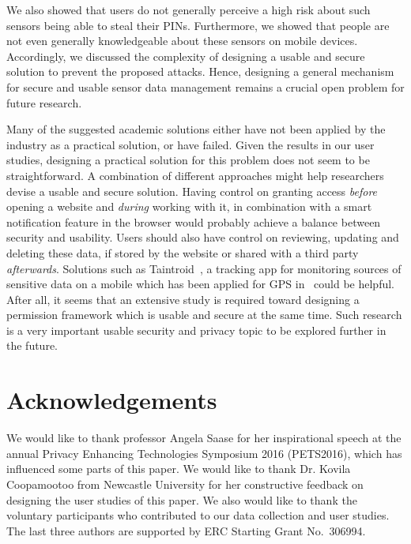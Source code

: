 \documentclass[10pt,twocolumn]{article}
\begin{document}
We also showed that users do not generally perceive a high risk about such sensors being able to steal their PINs. Furthermore, we showed that people are not even generally knowledgeable about these sensors on mobile devices. Accordingly, we discussed the complexity of designing a usable and secure solution to prevent the proposed attacks.
Hence, designing a general mechanism for secure and usable sensor data management remains a crucial open problem for future research. 


Many of the suggested academic solutions either have not been applied by the industry as a practical solution, or have failed. Given the results in our user studies, designing a practical solution for this problem does not seem to be straightforward.  A combination of different approaches might help researchers devise a usable and secure solution. Having control on granting access \emph{before} opening a website and \emph{during} working with it, in combination with a smart notification feature in the browser would probably achieve a balance between security and usability. 
Users should also have control on reviewing, updating and deleting these data, if stored by the website or shared with a third party \emph{afterwards}.  
Solutions such as Taintroid~\cite{rod}, a tracking app for monitoring sources of sensitive data on a mobile which has been applied for GPS in~\cite{brothers} could be helpful. After all, it seems that an extensive study is required toward designing a permission framework which is usable and secure at the same time. Such research is a very important usable security and privacy topic to be explored further in the future. 

\section*{Acknowledgements}
We would like to thank professor Angela Saase for her inspirational speech at the annual Privacy Enhancing Technologies Symposium 2016 (PETS2016), which has influenced some parts of this paper. 
We would like to thank Dr. Kovila Coopamootoo from Newcastle University for her constructive feedback on designing the user studies of this paper. 
We also would like to thank the voluntary participants who contributed to our data collection and user studies.
The last three authors are supported by ERC Starting Grant No.~306994. 
\end{document}
